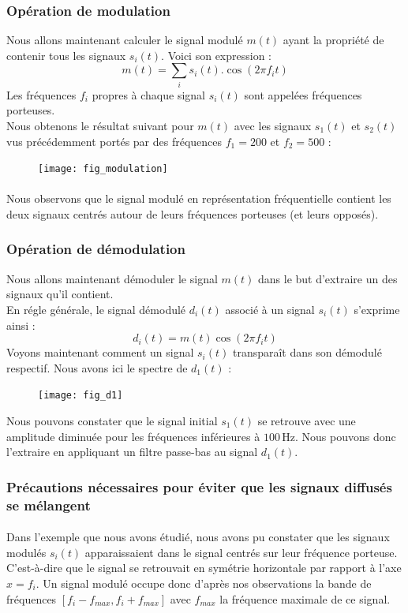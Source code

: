 \documentclass{article}
\begin{document}
\subsubsection{Opération de modulation}
Nous allons maintenant calculer le signal modulé $m(t)$ ayant la propriété de contenir tous les signaux $s_i(t)$. Voici son expression :
$$m(t)=\sum_{i}s_i(t).\cos(2\pi f_i t)$$
Les fréquences $f_i$ propres à chaque signal $s_i(t)$ sont appelées fréquences porteuses. \\
Nous obtenons le résultat suivant pour $m(t)$ avec les signaux $s_1(t)$ et $s_2(t)$ vus précédemment portés par des fréquences $f_1=200$ et $f_2=500$ :
\begin{figure}[h]
\texttt{[image: fig\_modulation]}
\centering
\end{figure}
\paragraph{}
Nous observons que le signal modulé en représentation fréquentielle contient les deux signaux centrés autour de leurs fréquences porteuses (et leurs opposés).

\subsubsection{Opération de démodulation}
Nous allons maintenant démoduler le signal $m(t)$ dans le but d'extraire un des signaux qu'il contient. \\
En régle générale, le signal démodulé $d_i(t)$ associé à un signal $s_i(t)$ s'exprime ainsi :
$$d_i(t)=m(t)\cos(2\pi f_i t)$$
\newpage
Voyons maintenant comment un signal $s_i(t)$ transparaît dans son démodulé respectif. Nous avons ici le spectre de $d_1(t)$ :
\begin{figure}[h]
\texttt{[image: fig\_d1]}
\centering
\end{figure}
Nous pouvons constater que le signal initial $s_1(t)$ se retrouve avec une amplitude diminuée pour les fréquences inférieures à $100\,\mathrm{Hz}$. Nous pouvons donc l'extraire en appliquant un filtre passe-bas au signal $d_1(t)$.

\subsubsection{Précautions nécessaires pour éviter que les signaux diffusés se mélangent}
\paragraph{}
Dans l'exemple que nous avons étudié, nous avons pu constater que les signaux modulés $s_i(t)$ apparaissaient dans le signal centrés sur leur fréquence porteuse. C'est-à-dire que le signal se retrouvait en symétrie horizontale par rapport à l'axe $x=f_i$. Un signal modulé occupe donc d'après nos observations la bande de fréquences $[f_i-f_{max},f_i+f_{max}]$ avec $f_{max}$ la fréquence maximale de ce signal.
\end{document}
